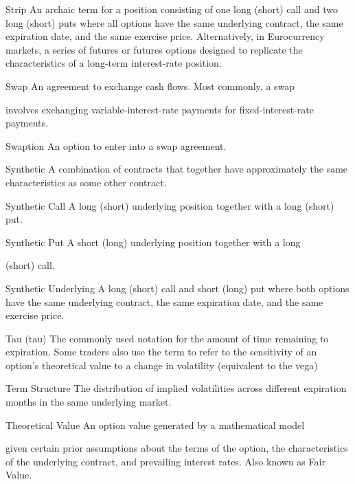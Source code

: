 Strip An archaic term for a position consisting of one long (short) call and two long (short) puts where all options have the same underlying contract, the same expiration date, and the same exercise price. Alternatively, in Eurocurrency markets, a series of futures or futures options designed to replicate the characteristics of a long-term interest-rate position.\par
Swap An agreement to exchange cash flows. Most commonly, a swap\par
involves exchanging variable-interest-rate payments for fixed-interest-rate payments.\par
Swaption An option to enter into a swap agreement.\par
Synthetic A combination of contracts that together have approximately the same characteristics as some other contract.\par
Synthetic Call A long (short) underlying position together with a long (short) put.\par
Synthetic Put A short (long) underlying position together with a long\par
(short) call.\par
Synthetic Underlying A long (short) call and short (long) put where both options have the same underlying contract, the same expiration date, and the same exercise price.\par
Tau (tau) The commonly used notation for the amount of time remaining to expiration. Some traders also use the term to refer to the sensitivity of an option's theoretical value to a change in volatility (equivalent to the vega)\par
Term Structure The distribution of implied volatilities across different expiration months in the same underlying market.\par
Theoretical Value An option value generated by a mathematical model\par
given certain prior assumptions about the terms of the option, the characteristics of the underlying contract, and prevailing interest rates. Also known as Fair Value.\par

